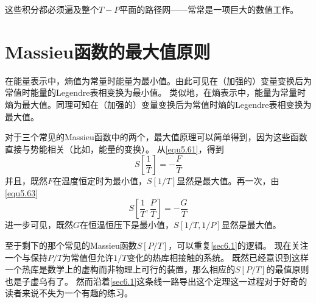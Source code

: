 这些积分都必须遍及整个$T-P$平面的路径网——常常是一项巨大的数值工作。

\section{Massieu函数的最大值原则}
\label{sec6.7}
在能量表示中，熵值为常量时能量为最小值。由此可见在（加强的）变量变换后为常值时能量的Legendre表相变换为最小值。
类似地，在熵表示中，能量为常量时熵为最大值。同理可知在（加强的）变量变换后为常值时熵的Legendre表相变换为最大值。%

对于三个常见的Massieu函数中的两个，最大值原理可以简单得到，因为这些函数直接与势能相关（比如，能量的变换）。
从\eqref{equ5.61}，得到
\begin{equation}
S\left[\frac{1}{T}\right]=-\frac{F}{T}
\end{equation}
并且，既然$F$在温度恒定时为最小值，$S[1/T]$显然是最大值。再一次，由\eqref{equ5.63}
\begin{equation}
S\left[\frac{1}{T},\frac{P}{T}\right]=-\frac{G}{T}
\end{equation}
进一步可见，既然$G$在恒温恒压下是最小值，$S[1/T,1/P]$显然是最大值。

至于剩下的那个常见的Massieu函数$S[P/T]$，可以重复\ref{sec6.1}的逻辑。
现在关注一个与保持$P/T$为常值但允许$1/T$变化的热库相接触的系统。
既然已经意识到这样一个热库是数学上的虚构而非物理上可行的装置，那么相应的$S[P/T]$的最值原则也是子虚乌有了。
然而沿着\ref{sec6.1}这条线一路导出这个定理这一过程对于好奇的读者来说不失为一个有趣的练习。
